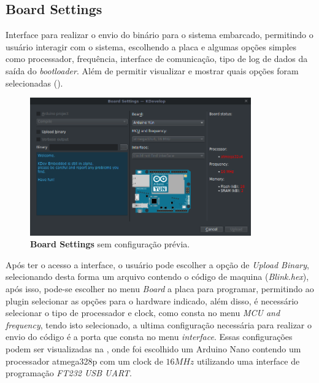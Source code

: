 \subsection{Board Settings}

Interface para realizar o envio do binário para o sistema embarcado, permitindo o usuário interagir com o sistema, escolhendo a placa e algumas opções simples como processador, frequência, interface de comunicação, tipo de log de dados da saída do \textit{bootloader}. Além de permitir visualizar e mostrar quais opções foram selecionadas ().

\begin{figure}[!htb]
  \centering
  \caption[Board Settings com configuração inicial]{\textbf{Board Settings} sem configuração prévia.}
  \label{fig:boardsettings}
  \includegraphics[width=0.85\textwidth]{figuras/boardsettings.png}
\end{figure}

Após ter o acesso a interface, o usuário pode escolher a opção de \textit{Upload Binary}, selecionando desta forma um arquivo contendo o código de maquina (\textit{Blink.hex}), após isso, pode-se escolher no menu \textit{Board} a placa para programar, permitindo ao plugin selecionar as opções para o hardware indicado, além disso, é necessário selecionar o tipo de processador e clock, como consta no menu \textit{MCU and frequency}, tendo isto selecionado, a ultima configuração necessária para realizar o envio do código é a porta que consta no menu \textit{interface}. Essas configurações podem ser visualizadas na , onde foi escolhido um Arduino Nano contendo um processador atmega328p com um clock de $16MHz$ utilizando uma interface de programação \textit{FT232 USB UART}.

